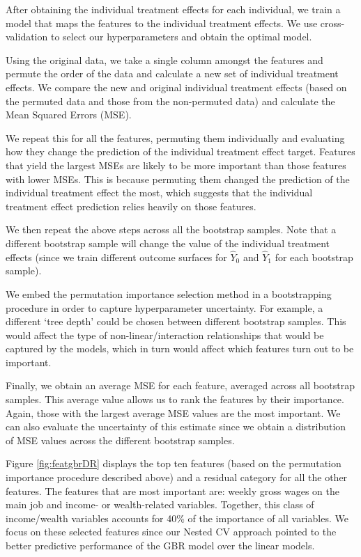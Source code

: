 \documentclass[12pt, a4paper]{article}
\begin{document}
After obtaining the individual treatment effects for each individual, we train a model that maps the features to the individual treatment effects. We use cross-validation to select our hyperparameters and obtain the optimal model. 

Using the original data, we take a single column amongst the features and permute the order of the data and calculate a new set of individual treatment effects. We compare the new and original individual treatment effects (based on the permuted data and those from the non-permuted data) and calculate the Mean Squared Errors (MSE). 

We repeat this for all the features, permuting them individually and evaluating how they change the prediction of the individual treatment effect target. Features that yield the largest MSEs are likely to be more important than those features with lower MSEs. This is because permuting them changed the prediction of the individual treatment effect the most, which suggests that the individual treatment effect prediction relies heavily on those features.

We then repeat the above steps across all the bootstrap samples. Note that a different bootstrap sample will change the value of the individual treatment effects (since we train different outcome surfaces for $\hat{Y}_0$ and $\hat{Y}_1$ for each bootstrap sample).

We embed the permutation importance selection method in a bootstrapping procedure in order to capture hyperparameter uncertainty. For example, a different ‘tree depth’ could be chosen between different bootstrap samples. This would affect the type of non-linear/interaction relationships that would be captured by the models, which in turn would affect which features turn out to be important. 

Finally, we obtain an average MSE for each feature, averaged across all bootstrap samples. This average value allows us to rank the features by their importance. Again, those with the largest average MSE values are the most important. We can also evaluate the uncertainty of this estimate since we obtain a distribution of MSE values across the different bootstrap samples.

Figure \ref{fig:featgbrDR} displays the top ten features (based on the permutation importance procedure described above) and a residual category for all the other features. The features that are most important are: weekly gross wages on the main job and income- or wealth-related variables. Together, this class of income/wealth variables accounts for 40\% of the importance of all variables. We focus on these selected features since our Nested CV approach pointed to the better predictive performance of the GBR model over the linear models.
\end{document}
